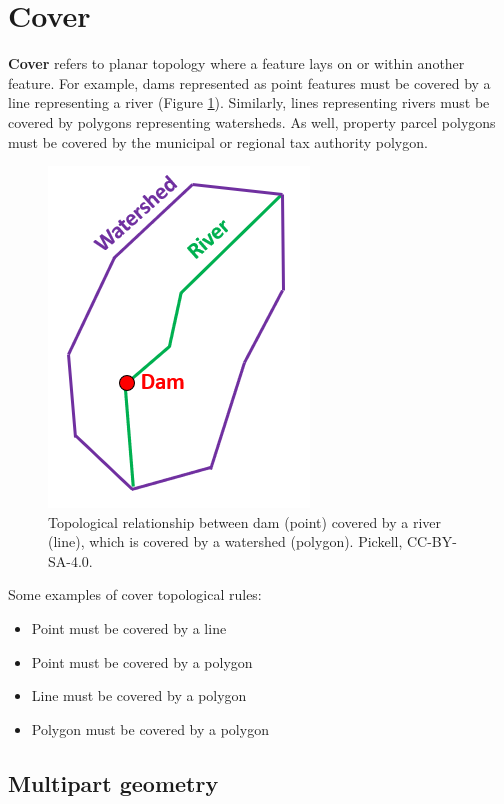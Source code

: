 \documentclass[
]{book}
\providecommand{\tightlist}{%
  \setlength{\itemsep}{0pt}\setlength{\parskip}{0pt}}
\begin{document}
\section{Cover}\label{cover}

\textbf{Cover} refers to planar topology where a feature lays on or within another feature. For example, dams represented as point features must be covered by a line representing a river (Figure \ref{fig:7-dam-river-watershed}). Similarly, lines representing rivers must be covered by polygons representing watersheds. As well, property parcel polygons must be covered by the municipal or regional tax authority polygon.

\begin{figure}
\includegraphics[width=0.5\linewidth]{images/07-dam-river-watershed} \caption{Topological relationship between dam (point) covered by a river (line), which is covered by a watershed (polygon). Pickell, CC-BY-SA-4.0.}\label{fig:7-dam-river-watershed}
\end{figure}

Some examples of cover topological rules:

\begin{itemize}
\tightlist
\item
  Point must be covered by a line
\item
  Point must be covered by a polygon
\item
  Line must be covered by a polygon
\item
  Polygon must be covered by a polygon
\end{itemize}

\subsection{Multipart geometry}\label{multipart-geometry}
\end{document}

